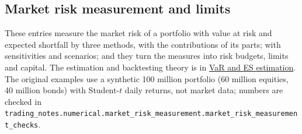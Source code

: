 \subsection{Market risk measurement and limits}

These entries measure the market risk of a portfolio with value at risk and expected shortfall by three methods, with the contributions of its parts; with sensitivities and scenarios; and they turn the measures into risk budgets, limits and capital. The estimation and backtesting theory is in \hyperref[meth:var-es-estimation-methods]{VaR and ES estimation}. The original examples use a synthetic 100 million portfolio (60 million equities, 40 million bonds) with Student-$t$ daily returns, not market data; numbers are checked in \nolinkurl{trading_notes.numerical.market_risk_measurement.market_risk_measurement_checks}.

